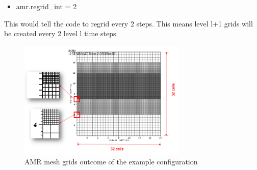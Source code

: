 \begin{itemize}
\item amr.regrid\_int = 2
\end{itemize}
This would tell the code to regrid every 2 steps. This means level l+1 grids will be created every 2 level l time steps.


\begin{figure}[H]
	\centering
    \includegraphics[width=8cm]{figs/AMR_resolution_explaination.png}
        \caption{AMR mesh grids outcome of the example configuration}
        \label{fig:AMR_resolution_explaination}
\end{figure}






